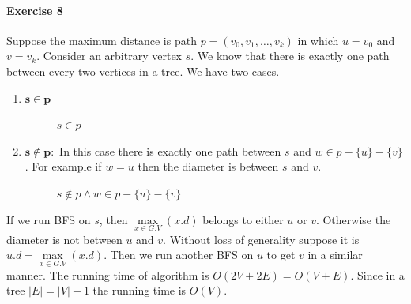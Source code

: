 \documentclass{book}
\begin{document}
	\paragraph{Exercise 8}
	Suppose the maximum distance is path $p = (v_0, v_1, \dots, v_k)$ in which $u = v_0$ and $v = v_k$. Consider an arbitrary vertex $s$. We know that there is exactly one path between every two vertices in a tree. We have two cases.
	\begin{enumerate}
		\item $\boldsymbol{s \in p}$
		\begin{figure}[h!]
			\centering
			\caption{$s \in p$}
		\end{figure}		
		\item $\boldsymbol{s \not \in p:}$ In this case there is exactly one path between $s$ and $w \in p - \{u\} - \{v\}$. For example if $w = u$ then the diameter is between $s$ and $v$.
		\begin{figure}[h!]
			\centering
			\caption{$s \not\in p \land w \in p - \{u\} - \{v\}$}
		\end{figure}		
	\end{enumerate}
	If we run BFS on $s$, then $\max\limits_{x \in G.V}(x.d)$ belongs to either $u$ or $v$. Otherwise the diameter is not between $u$ and $v$. Without loss of generality suppose it is $u.d = \max\limits_{x \in G.V}(x.d)$. Then we run another BFS on $u$ to get $v$ in a similar manner. The running time of algorithm is $O(2V + 2E) = O(V + E)$. Since in a tree $|E| = |V| - 1$ the running time is $O(V)$.
\end{document}
